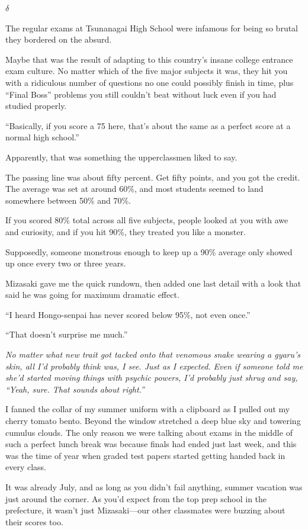 \documentclass[
    a4paper,
    12pt,
    twoside,
    openany,
    UTF8,
    fontset=windows
]{ctexbook}
\begin{document}
$\delta$

The regular exams at Tsunanagai High School were infamous for being so brutal they bordered on the absurd.

Maybe that was the result of adapting to this country's insane college entrance exam culture. No matter which of the five major subjects it was, they hit you with a ridiculous number of questions no one could possibly finish in time, plus ``Final Boss'' problems you still couldn't beat without luck even if you had studied properly.

``Basically, if you score a 75 here, that's about the same as a perfect score at a normal high school.''

Apparently, that was something the upperclassmen liked to say.

The passing line was about fifty percent. Get fifty points, and you got the credit. The average was set at around 60\%, and most students seemed to land somewhere between 50\% and 70\%.

If you scored 80\% total across all five subjects, people looked at you with awe and curiosity, and if you hit 90\%, they treated you like a monster.

Supposedly, someone monstrous enough to keep up a 90\% average only showed up once every two or three years.

Mizasaki gave me the quick rundown, then added one last detail with a look that said he was going for maximum dramatic effect.

``I heard Hongo-senpai has never scored below 95\%, not even once.''

``That doesn't surprise me much.''

\textit{No matter what new trait got tacked onto that venomous snake wearing a gyaru's skin, all I'd probably think was, I see. Just as I expected. Even if someone told me she'd started moving things with psychic powers, I'd probably just shrug and say, ``Yeah, sure. That sounds about right.''}

I fanned the collar of my summer uniform with a clipboard as I pulled out my cherry tomato bento. Beyond the window stretched a deep blue sky and towering cumulus clouds. The only reason we were talking about exams in the middle of such a perfect lunch break was because finals had ended just last week, and this was the time of year when graded test papers started getting handed back in every class.

It was already July, and as long as you didn't fail anything, summer vacation was just around the corner. As you'd expect from the top prep school in the prefecture, it wasn't just Mizasaki---our other classmates were buzzing about their scores too.
\end{document}
